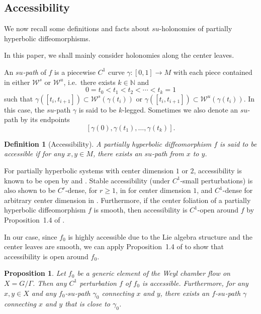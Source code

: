 \documentclass[11pt]{amsart}
\numberwithin{equation}{section}
\newcommand{\N}{\mathbb{N}}
\newcommand{\W}{\mathcal{W}}
\theoremstyle{plain}
\newtheorem{prop}[thm]{Proposition}
\newtheorem{lem}[thm]{Lemma}
\newtheorem{defi}{Definition}[section]
\begin{document}

\subsection{Accessibility}
We now recall some definitions and facts about $su$-holonomies of partially hyperbolic diffeomorphisms.

In this paper, we shall mainly consider holonomies along the center leaves.

An \emph{$su$-path} of $f$ is a piecewise $C^1$ curve $\gamma:[0,1]\to M$ with each piece contained in either $\W^s$ or $\W^u$, i.e.\ there exists $k\in \N$ and
\[
0=t_0<t_1<t_2<\cdots<t_k=1
\]
such that $\gamma([t_i,t_{i+1}])\subset \W^s(\gamma(t_i))$ or $\gamma([t_i,t_{i+1}])\subset \W^u(\gamma(t_i))$. In this case, the $su$-path $\gamma$ is said to be $k$-legged. Sometimes we also denote an $su$-path by its endpoints
\[
[\gamma(0),\gamma(t_1),\ldots,\gamma(t_k)].
\]

\begin{defi}[Accessibility]
A partially hyperbolic diffeomorphism $f$ is said to be \emph{accessible} if for any $x,y\in M$, there exists an $su$-path from $x$ to $y$.
\end{defi}

For partially hyperbolic systems with center dimension $1$ or $2$, accessibility is known to be open by \cite{Didier} and \cite{AV}. Stable accessibility (under $C^1$-small perturbations) is also shown to be $C^r$-dense, for $r\ge 1$, in \cite{RHU} for center dimension $1$, and $C^1$-dense for arbitrary center dimension in \cite{DW}. Furthermore, if the center foliation of a partially hyperbolic diffeomorphism $f$ is smooth, then accessibility is $C^1$-open around $f$ by Proposition~1.4 of \cite{GPS}.

In our case, since $f_0$ is highly accessible due to the Lie algebra structure and the center leaves are smooth, we can apply Proposition~1.4 of \cite{GPS} to show that accessibility is open around $f_0$.

\begin{prop}\label{faccess}
Let $f_0$ be a generic element of the Weyl chamber flow on $X=G/\Gamma$. Then any $C^1$ perturbation $f$ of $f_0$ is accessible. Furthermore, for any $x,y\in X$ and any $f_0$-$su$-path $\gamma_0$ connecting $x$ and $y$, there exists an $f$-$su$-path $\gamma$ connecting $x$ and $y$ that is close to $\gamma_0$.
\end{prop}
\end{document}
